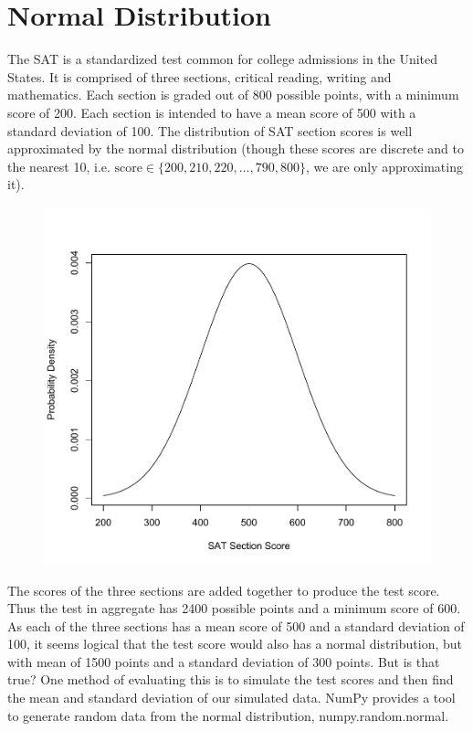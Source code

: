 \section*{Normal Distribution}
The SAT is a standardized test common for college admissions in the United States. 
It is comprised of three sections, critical reading, writing and mathematics. 
Each section is graded out of 800 possible points, with a minimum score of 200.
Each section is intended to have a mean score of 500 with a standard deviation of 100.  
The distribution of SAT section scores is well approximated by the normal distribution 
(though these scores are discrete and to the nearest 10, i.e. $\mbox{score} \in \{200,210,220,\dots,790,800\}$, we are only approximating it). 
\begin{figure}[h]
\includegraphics[width=\textwidth]{normaldist.pdf}
\end{figure}

The scores of the three sections are added together to produce the test score. 
Thus the test in aggregate has 2400 possible points and a minimum score of 600.  
As each of the three sections has a mean score of 500 and a standard deviation of 100, it seems logical that the test score would also has a normal distribution, 
but with mean of 1500 points and a standard deviation of 300 points. 
But is that true? One method of evaluating this is to simulate the test scores and then find the mean and standard deviation of our simulated data. 
NumPy provides a tool to generate random data from the normal distribution, numpy.random.normal.

